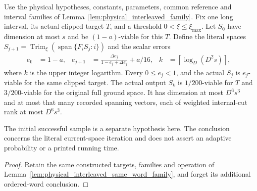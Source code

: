\begin{lemma}
    \label{lem:physical_interleaved_iterates}
    \leanok
    Use the physical hypotheses, constants, parameters, common reference and
    interval families of Lemma~\ref{lem:physical_interleaved_family}.
    Fix one long interval, its actual clipped target $T$, and a threshold
    $0<\xi\le\xi_{\max}$. Let $S_0$ have dimension at most $s$ and be
    $(1-a)$-viable for this $T$. Define the literal spaces
    $S_{j+1}=\operatorname{Trim}_{\xi}(\operatorname{span}\{F_iS_j:i\})$ and
    the scalar errors
    \begin{align}
        e_0     & =1-a,                                      &
        e_{j+1} & =\frac{\Delta e_j}{1-e_j+\Delta e_j}+a/16, &
        k       & =\left\lceil\log_D(D^2s)\right\rceil,
        \label{eq:physical_interleaved_stopping}
    \end{align}
    where $k$ is the upper integer logarithm. Every $0\le e_j<1$, and
    the actual $S_j$ is $e_j$-viable for the same clipped target.
    The actual output $S_k$ is $1/200$-viable for $T$ and $3/200$-viable
    for the original full ground space. It has dimension at most $D^6s^3$
    and at most that many recorded spanning vectors, each of weighted
    internal-cut rank at most $D^6s^3$.

    The initial successful sample is a separate hypothesis here. The
    conclusion concerns the literal current-space iteration and does not
    assert an adaptive probability or a printed running time.
\end{lemma}
\begin{proof}\leanok
    Retain the same constructed targets, families and operation of
    Lemma~\ref{lem:physical_interleaved_same_word_family}, and forget
    its additional ordered-word conclusion.
\end{proof}



